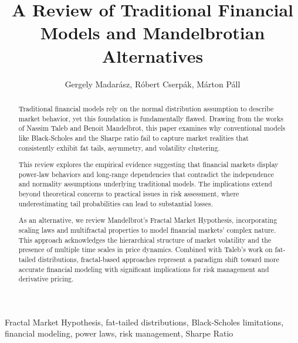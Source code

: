 \documentclass{ieeetj}
\begin{document}


\title{A Review of Traditional Financial Models and Mandelbrotian Alternatives}

\author{Gergely Madarász, Róbert Cserpák, Márton Páll}


\begin{abstract}
Traditional financial models rely on the normal distribution assumption to describe market behavior, yet this foundation is fundamentally flawed.
Drawing from the works of Nassim Taleb\cite{taleb2025} and Benoit Mandelbrot\cite{mandelbrot2004}, this paper examines why conventional models like Black-Scholes and the Sharpe ratio fail to capture market realities that consistently exhibit fat tails, asymmetry, and volatility clustering.

This review explores the empirical evidence suggesting that financial markets display power-law behaviors and long-range dependencies that contradict the independence and normality assumptions underlying traditional models.
The implications extend beyond theoretical concerns to practical issues in risk assessment, where underestimating tail probabilities can lead to substantial losses.

As an alternative, we review Mandelbrot's Fractal Market Hypothesis, incorporating scaling laws and multifractal properties to model financial markets' complex nature. This approach acknowledges the hierarchical structure of market volatility and the presence of multiple time scales in price dynamics.
Combined with Taleb's work on fat-tailed distributions, fractal-based approaches represent a paradigm shift toward more accurate financial modeling with significant implications for risk management and derivative pricing.
\end{abstract}

\begin{IEEEkeywords}
Fractal Market Hypothesis, fat-tailed distributions, Black-Scholes limitations, financial modeling, power laws, risk management, Sharpe Ratio
\end{IEEEkeywords}


\maketitle
\end{document}
